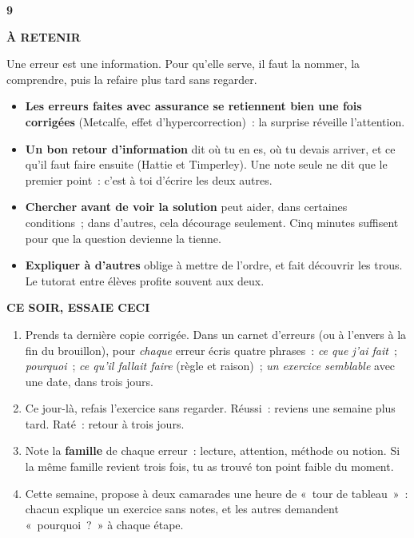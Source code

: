 \documentclass[10pt,twoside,openany]{book}
\newenvironment{aretenir}[1][À retenir]{\par\begin{tcolorbox}[enhanced,colback=creme,colframe=accent,boxrule=0pt,leftrule=3pt,arc=0pt,left=8pt,right=8pt,top=5pt,bottom=5pt,breakable]{\small\bfseries\color{accent}\MakeUppercase{#1}}\par\smallskip}{\end{tcolorbox}\par}
\newenvironment{cesoir}[1][Ce soir, essaie ceci]{\par\begin{tcolorbox}[enhanced,colback=white,colframe=vert,boxrule=0.6pt,arc=2pt,left=8pt,right=8pt,top=5pt,bottom=5pt,breakable]{\small\bfseries\color{vert}\MakeUppercase{#1}}\par\smallskip\small}{\end{tcolorbox}\par}
\newcommand{\fiche}[3]{\clearpage\markright{#2}\thispagestyle{plain}%
 {\noindent\color{accent}\fontsize{40}{40}\selectfont\bfseries #1}\hspace{0.6em}{\Large\bfseries #2\par}\vspace{0.1em}{\small\color{gris}\itshape #3\par}\vspace{0.5em}}
\begin{document}
\fiche{9}{L’encre rouge}{Chapitre 9 du livre}
\begin{aretenir}
Une erreur est une information. Pour qu’elle serve, il faut la nommer, la comprendre, puis la refaire plus tard sans regarder.
\end{aretenir}
\begin{itemize}
\item \textbf{Les erreurs faites avec assurance se retiennent bien une fois corrigées} (Metcalfe, effet d’hypercorrection) : la surprise réveille l’attention.
\item \textbf{Un bon retour d’information} dit où tu en es, où tu devais arriver, et ce qu’il faut faire ensuite (Hattie et Timperley). Une note seule ne dit que le premier point : c’est à toi d’écrire les deux autres.
\item \textbf{Chercher avant de voir la solution} peut aider, dans certaines conditions ; dans d’autres, cela décourage seulement. Cinq minutes suffisent pour que la question devienne la tienne.
\item \textbf{Expliquer à d’autres} oblige à mettre de l’ordre, et fait découvrir les trous. Le tutorat entre élèves profite souvent aux deux.
\end{itemize}
\begin{cesoir}
\begin{enumerate}
\item Prends ta dernière copie corrigée. Dans un carnet d’erreurs (ou à l’envers à la fin du brouillon), pour \emph{chaque} erreur écris quatre phrases : \emph{ce que j’ai fait} ; \emph{pourquoi} ; \emph{ce qu’il fallait faire} (règle et raison) ; \emph{un exercice semblable} avec une date, dans trois jours.
\item Ce jour-là, refais l’exercice sans regarder. Réussi : reviens une semaine plus tard. Raté : retour à trois jours.
\item Note la \textbf{famille} de chaque erreur : lecture, attention, méthode ou notion. Si la même famille revient trois fois, tu as trouvé ton point faible du moment.
\item Cette semaine, propose à deux camarades une heure de « tour de tableau » : chacun explique un exercice sans notes, et les autres demandent « pourquoi ? » à chaque étape.
\end{enumerate}
\end{cesoir}
\end{document}
